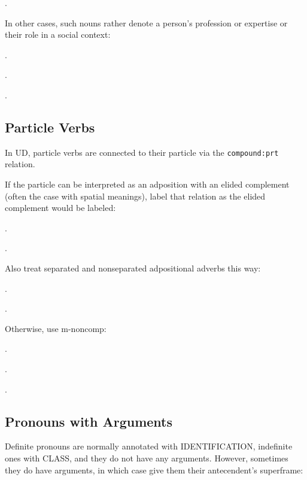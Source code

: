 \documentclass[a4paper]{article}
\newcommand{\fr}[1]{\textsf{#1}}
\newcommand{\rl}[1]{\textsf{#1}}
\begin{document}
\ex.

In other cases, such nouns rather denote a person's profession or expertise or
their role in a social context:

\ex.

\ex.

\ex.


\newpage\subsection{Particle Verbs}

In UD, particle verbs are connected to their particle via the
\texttt{compound:prt} relation.

If the particle can be interpreted as an adposition with an elided complement
(often the case with spatial meanings), label that relation as the elided
complement would be labeled:

\ex.

\ex.

Also treat separated and nonseparated adpositional adverbs this way:

\ex.

\ex.

Otherwise, use \rl{m-noncomp}:

\ex.

\ex.

\ex.


\newpage\subsection{Pronouns with Arguments}

Definite pronouns are normally annotated with \fr{IDENTIFICATION}, indefinite
ones with \fr{CLASS}, and they do not have any arguments. However, sometimes
they do have arguments, in which case give them their antecendent's superframe:
\end{document}

